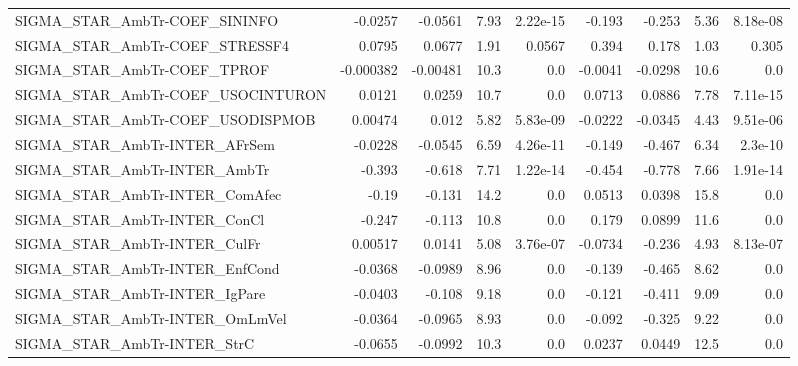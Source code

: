 \begin{tabular}{lrrrrrrrr}
SIGMA\_STAR\_AmbTr-COEF\_SININFO          &     -0.0257 &      -0.0561 &     7.93 & 2.22e-15 &     -0.193 &      -0.253 &         5.36 &      8.18e-08 \\
SIGMA\_STAR\_AmbTr-COEF\_STRESSF4         &      0.0795 &       0.0677 &     1.91 &   0.0567 &      0.394 &       0.178 &         1.03 &         0.305 \\
SIGMA\_STAR\_AmbTr-COEF\_TPROF            &   -0.000382 &     -0.00481 &     10.3 &      0.0 &    -0.0041 &     -0.0298 &         10.6 &           0.0 \\
SIGMA\_STAR\_AmbTr-COEF\_USOCINTURON      &      0.0121 &       0.0259 &     10.7 &      0.0 &     0.0713 &      0.0886 &         7.78 &      7.11e-15 \\
SIGMA\_STAR\_AmbTr-COEF\_USODISPMOB       &     0.00474 &        0.012 &     5.82 & 5.83e-09 &    -0.0222 &     -0.0345 &         4.43 &      9.51e-06 \\
SIGMA\_STAR\_AmbTr-INTER\_AFrSem          &     -0.0228 &      -0.0545 &     6.59 & 4.26e-11 &     -0.149 &      -0.467 &         6.34 &       2.3e-10 \\
SIGMA\_STAR\_AmbTr-INTER\_AmbTr           &      -0.393 &       -0.618 &     7.71 & 1.22e-14 &     -0.454 &      -0.778 &         7.66 &      1.91e-14 \\
SIGMA\_STAR\_AmbTr-INTER\_ComAfec         &       -0.19 &       -0.131 &     14.2 &      0.0 &     0.0513 &      0.0398 &         15.8 &           0.0 \\
SIGMA\_STAR\_AmbTr-INTER\_ConCl           &      -0.247 &       -0.113 &     10.8 &      0.0 &      0.179 &      0.0899 &         11.6 &           0.0 \\
SIGMA\_STAR\_AmbTr-INTER\_CulFr           &     0.00517 &       0.0141 &     5.08 & 3.76e-07 &    -0.0734 &      -0.236 &         4.93 &      8.13e-07 \\
SIGMA\_STAR\_AmbTr-INTER\_EnfCond         &     -0.0368 &      -0.0989 &     8.96 &      0.0 &     -0.139 &      -0.465 &         8.62 &           0.0 \\
SIGMA\_STAR\_AmbTr-INTER\_IgPare          &     -0.0403 &       -0.108 &     9.18 &      0.0 &     -0.121 &      -0.411 &         9.09 &           0.0 \\
SIGMA\_STAR\_AmbTr-INTER\_OmLmVel         &     -0.0364 &      -0.0965 &     8.93 &      0.0 &     -0.092 &      -0.325 &         9.22 &           0.0 \\
SIGMA\_STAR\_AmbTr-INTER\_StrC            &     -0.0655 &      -0.0992 &     10.3 &      0.0 &     0.0237 &      0.0449 &         12.5 &           0.0 \\

\end{tabular}
